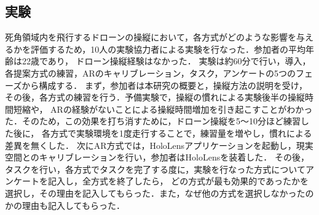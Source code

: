 \documentclass[a4paper,10pt,twocolumn,uplatex]{jsarticle}
\begin{document}

  

\subsection{実験}
死角領域内を飛行するドローンの操縦において，各方式がどのような影響を与えるかを評価するため，10人の実験協力者による実験を行なった．参加者の平均年齢は22歳であり，
ドローン操縦経験はなかった．
実験は約60分で行い，導入，各提案方式の練習，ARのキャリブレーション，タスク，アンケートの5つのフェーズから構成する．
まず，参加者は本研究の概要と，操縦方法の説明を受け，その後，各方式の練習を行う．予備実験で，操縦の慣れによる実験後半の操縦時間短縮や，
ARの経験がないことによる操縦時間増加を引き起こすことがわかった．そのため，この効果を打ち消すために，ドローン操縦を5〜10分ほど練習した後に，
各方式で実験環境を1度走行することで，練習量を増やし，慣れによる差異を無くした．
次にAR方式では，HoloLensアプリケーションを起動し，現実空間とのキャリブレーションを行い，参加者はHoloLensを装着した．
その後，タスクを行い，各方式でタスクを完了する度に，実験を行なった方式についてアンケートを記入し，全方式を終了したら，
どの方式が最も効果的であったかを選択し，その理由を記入してもらった．また，なぜ他の方式を選択しなかったのかの理由も記入してもらった．
\end{document}
